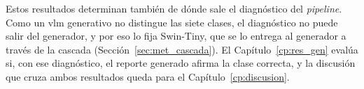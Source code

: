 Estos resultados determinan también de dónde sale el diagnóstico del \emph{pipeline}. Como un \gls{vlm} generativo no distingue las siete clases, el
diagnóstico no puede salir del generador, y por eso lo fija Swin-Tiny, que se lo entrega al generador a través de la
cascada (Sección~\ref{sec:met_cascada}). El Capítulo~\ref{cp:res_gen} evalúa si, con ese diagnóstico, el reporte
generado afirma la clase correcta, y la discusión que cruza ambos resultados queda para el
Capítulo~\ref{cp:discusion}.
